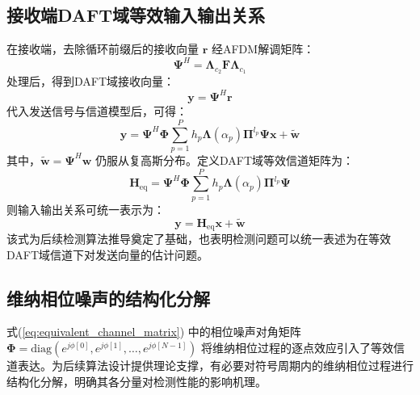 \subsection{接收端DAFT域等效输入输出关系}
\label{subsec:coherent_afdm_im_rx}

在接收端，去除循环前缀后的接收向量 $\mathbf{r}$ 经AFDM解调矩阵：
\begin{equation}
    \boldsymbol{\Psi}^{H} = \boldsymbol{\Lambda}_{c_2} \mathbf{F} \boldsymbol{\Lambda}_{c_1}
    \label{eq:afdm_demod_matrix}
\end{equation}
处理后，得到DAFT域接收向量：
\begin{equation}
    \mathbf{y} = \boldsymbol{\Psi}^{H} \mathbf{r}
    \label{eq:daft_received_signal}
\end{equation}
代入发送信号与信道模型后，可得：
\begin{equation}
    \mathbf{y}
    =
    \boldsymbol{\Psi}^{H}
    \boldsymbol{\Phi}
    \sum_{p=1}^{P} h_p \boldsymbol{\Lambda}(\alpha_p) \boldsymbol{\Pi}^{l_p}
    \boldsymbol{\Psi}
    \mathbf{x}
    +
    \tilde{\mathbf{w}}
    \label{eq:equivalent_daft_io_1}
\end{equation}
其中，$\tilde{\mathbf{w}}=\boldsymbol{\Psi}^{H}\mathbf{w}$ 仍服从复高斯分布。定义DAFT域等效信道矩阵为：
\begin{equation}
    \mathbf{H}_{\mathrm{eq}}
    =
    \boldsymbol{\Psi}^{H}
    \boldsymbol{\Phi}
    \sum_{p=1}^{P} h_p \boldsymbol{\Lambda}(\alpha_p) \boldsymbol{\Pi}^{l_p}
    \boldsymbol{\Psi}
    \label{eq:equivalent_channel_matrix}
\end{equation}
则输入输出关系可统一表示为：
\begin{equation}
    \mathbf{y} = \mathbf{H}_{\mathrm{eq}} \mathbf{x} + \tilde{\mathbf{w}}
    \label{eq:equivalent_daft_io_2}
\end{equation}
该式为后续检测算法推导奠定了基础，也表明检测问题可以统一表述为在等效DAFT域信道下对发送向量的估计问题。

\subsection{维纳相位噪声的结构化分解}
\label{subsec:phase_noise_decomposition}

式(\ref{eq:equivalent_channel_matrix}) 中的相位噪声对角矩阵 $\boldsymbol{\Phi} = \mathrm{diag}(e^{j\phi[0]}, e^{j\phi[1]}, \ldots, e^{j\phi[N-1]})$ 将维纳相位过程的逐点效应引入了等效信道表达。为后续算法设计提供理论支撑，有必要对符号周期内的维纳相位过程进行结构化分解，明确其各分量对检测性能的影响机理。


